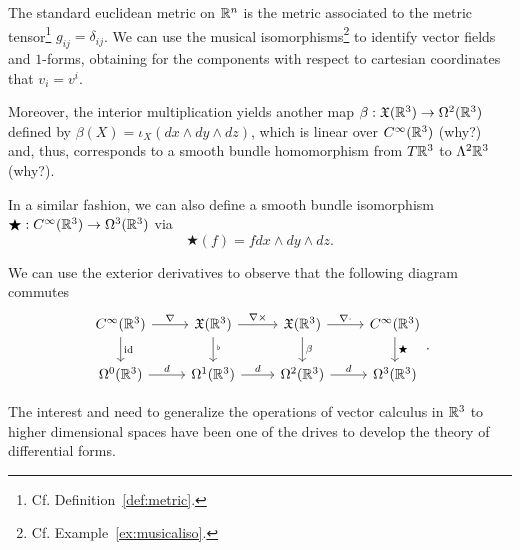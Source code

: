 \begin{example}
  The standard euclidean metric on $\mathbb{R}^n$ is the metric associated to the metric tensor\footnote{Cf. Definition~\ref{def:metric}.} $g_{ij} = \delta_{ij}$.
  We can use the musical isomorphisms\footnote{Cf. Example~\ref{ex:musicaliso}.} to identify vector fields and $1$-forms, obtaining for the components with respect to cartesian coordinates that $v_i = v^i$.
  
  Moreover, the interior multiplication yields another map $\beta: \mathfrak{X}(\mathbb{R}^3)\to\Omega^2(\mathbb{R}^3)$ defined by $\beta(X) = \iota_X (dx\wedge dy\wedge dz)$, which is linear over $C^\infty(\mathbb{R}^3)$ (why?) and, thus, corresponds to a smooth bundle homomorphism from $T\mathbb{R}^3$ to $\Lambda^2\mathbb{R}^3$ (why?).

  In a similar fashion, we can also define a smooth bundle isomorphism $\bigstar: C^\infty(\mathbb{R}^3) \to \Omega^3(\mathbb{R}^3)$ via
  \begin{equation}
    \bigstar(f) = f dx\wedge dy\wedge dz.
  \end{equation}

  We can use the exterior derivatives to observe that the following diagram commutes
  \begin{equation}\label{diag:comm:r3ops}
    \begin{tikzcd}
      C^\infty(\R^3) \arrow[d, "\id"] \arrow[r, "\nabla"] &
      \fX(\R^3) \arrow[d, "{}^\flat"] \arrow[r, "\nabla\times"] &
      \fX(\R^3) \arrow[d, "\beta"] \arrow[r, "\nabla\cdot"] &
      C^\infty(\R^3) \arrow[d, "\bigstar"] \\
      \Omega^0(\R^3) \arrow[r, "d"] &
      \Omega^1(\R^3) \arrow[r, "d"] &
      \Omega^2(\R^3) \arrow[r, "d"] &
      \Omega^3(\R^3)
    \end{tikzcd}.
  \end{equation}

  The interest and need to generalize the operations of vector calculus in $\mathbb{R}^3$ to higher dimensional spaces have been one of the drives to develop the theory of differential forms.


\end{example}
